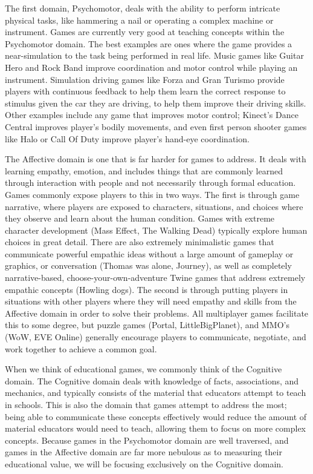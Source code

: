 \documentclass[12pt]{report}
\begin{document}
		The first domain, Psychomotor, deals with the ability to perform intricate physical tasks, like hammering a nail or operating a complex machine or instrument. Games are currently very good at teaching concepts within the Psychomotor domain. The best examples are ones where the game provides a near-simulation to the task being performed in real life. Music games like Guitar Hero and Rock Band improve coordination and motor control while playing an instrument. Simulation driving games like Forza and Gran Turismo provide players with continuous feedback to help them learn the correct response to stimulus given the car they are driving, to help them improve their driving skills. Other examples include any game that improves motor control; Kinect's Dance Central improves player's bodily movements, and even first person shooter games like Halo or Call Of Duty improve player's hand-eye coordination.

		The Affective domain is one that is far harder for games to address. It deals with learning empathy, emotion, and includes things that are commonly learned through interaction with people and not necessarily through formal education. Games commonly expose players to this in two ways. The first is through game narrative, where players are exposed to characters, situations, and choices where they observe and learn about the human condition. Games with extreme character development (Mass Effect, The Walking Dead) typically explore human choices in great detail. There are also extremely minimalistic games that communicate powerful empathic ideas without a large amount of gameplay or graphics, or conversation (Thomas was alone, Journey), as well as completely narrative-based, choose-your-own-adventure Twine games that address extremely empathic concepts (Howling dogs). The second is through putting players in situations with other players where they will need empathy and skills from the Affective domain in order to solve their problems. All multiplayer games facilitate this to some degree, but puzzle games (Portal, LittleBigPlanet), and MMO's (WoW, EVE Online) generally encourage players to communicate, negotiate, and work together to achieve a common goal.

		When we think of educational games, we commonly think of the Cognitive domain. The Cognitive domain deals with knowledge of facts, associations, and mechanics, and typically consists of the material that educators attempt to teach in schools. This is also the domain that games attempt to address the most; being able to communicate these concepts effectively would reduce the amount of material educators would need to teach, allowing them to focus on more complex concepts. Because games in the Psychomotor domain are well traversed, and games in the Affective domain are far more nebulous as to measuring their educational value, we will be focusing exclusively on the Cognitive domain.
\end{document}
